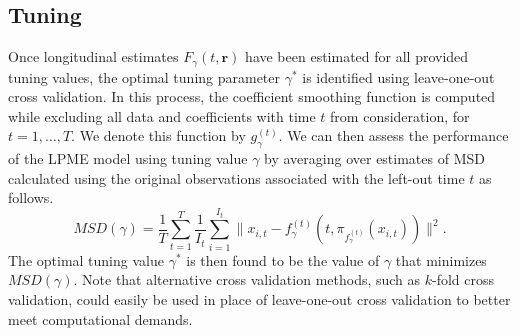 \documentclass[11pt,reqno]{article}
\newcommand{\meng}[1]{{\color{purple} \sf $\clubsuit\clubsuit\clubsuit$ Kun Meng: [#1]}}
\theoremstyle{definition}
\begin{document}
\subsection*{Tuning}

Once longitudinal estimates $F_{\gamma}(t, \boldsymbol{r})$ have been estimated for all provided tuning values, the optimal tuning parameter $\gamma^*$ is identified using leave-one-out cross validation. In this process, the coefficient smoothing function is computed while excluding all data and coefficients with time $t$ from consideration, for $t = 1, \dots, T$. We denote this function by $g_{\gamma}^{(t)}$. We can then assess the performance of the LPME model using tuning value $\gamma$ by averaging over estimates of MSD calculated using the original observations associated with the left-out time $t$ as follows.
\begin{equation}
  MSD(\gamma) = \frac{1}{T} \sum_{t=1}^{T}\frac{1}{I_t}\sum_{i=1}^{I_t}\|x_{i, t} - f_{\gamma}^{(t)}(t, \pi_{f_{\gamma}^{(t)}}(x_{i, t}))\|^2. \label{eq:18}
\end{equation}
The optimal tuning value $\gamma^*$ is then found to be the value of $\gamma$ that minimizes $MSD(\gamma)$. Note that alternative cross validation methods, such as $k$-fold cross validation, could easily be used in place of leave-one-out cross validation to better meet computational demands. 


\LinesNumbered


\LinesNumbered
\end{document}

